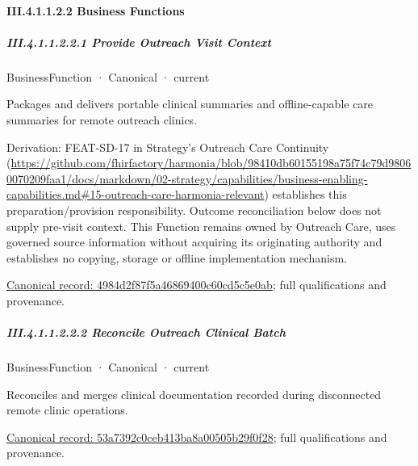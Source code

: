 \paragraph*{III.4.1.1.2.2 Business Functions}
\label{navigation:III.4.1.1.2.2}

\subparagraph*{III.4.1.1.2.2.1 Provide Outreach Visit Context}
\label{navigation:III.4.1.1.2.2.1}

\label{element:4984d2f87f5a46869400c60cd5c5e0ab}
{\small BusinessFunction · Canonical · current}\par

Packages and delivers portable clinical summaries and offline-capable care summaries for remote outreach clinics.



Derivation: FEAT-SD-17 in Strategy's Outreach Care Continuity (\url{https://github.com/fhirfactory/harmonia/blob/98410db60155198a75f74c79d98060070209faa1/docs/markdown/02-strategy/capabilities/business-enabling-capabilities.md#15-outreach-care-harmonia-relevant}) establishes this preparation/provision responsibility. Outcome reconciliation below does not supply pre-visit context. This Function remains owned by Outreach Care, uses governed source information without acquiring its originating authority and establishes no copying, storage or offline implementation mechanism.


{\footnotesize \href{../../../../../../../continuum/business/business-function/4984d2f87f5a46869400c60cd5c5e0ab.md}{Canonical record: 4984d2f87f5a46869400c60cd5c5e0ab}; full qualifications and provenance.}\par
\subparagraph*{III.4.1.1.2.2.2 Reconcile Outreach Clinical Batch}
\label{navigation:III.4.1.1.2.2.2}

\label{element:53a7392c0ceb413ba8a00505b29f0f28}
{\small BusinessFunction · Canonical · current}\par

Reconciles and merges clinical documentation recorded during disconnected remote clinic operations.


{\footnotesize \href{../../../../../../../continuum/business/business-function/53a7392c0ceb413ba8a00505b29f0f28.md}{Canonical record: 53a7392c0ceb413ba8a00505b29f0f28}; full qualifications and provenance.}\par
